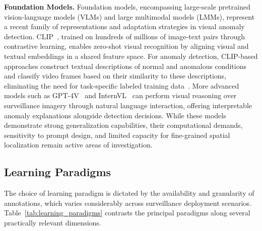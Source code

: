 \documentclass[10pt,a4paper]{article}
\begin{document}
\textbf{Foundation Models.} Foundation models, encompassing large-scale pretrained vision-language models (VLMs) and large multimodal models (LMMs), represent a recent family of representations and adaptation strategies in visual anomaly detection. CLIP~\citep{radford2021learning}, trained on hundreds of millions of image-text pairs through contrastive learning, enables zero-shot visual recognition by aligning visual and textual embeddings in a shared feature space. For anomaly detection, CLIP-based approaches construct textual descriptions of normal and anomalous conditions and classify video frames based on their similarity to these descriptions, eliminating the need for task-specific labeled training data~\citep{wu2024vadclip, zanella2024harnessing}. More advanced models such as GPT-4V~\citep{achiam2023gpt} and InternVL~\citep{chen2024internvl} can perform visual reasoning over surveillance imagery through natural language interaction, offering interpretable anomaly explanations alongside detection decisions. While these models demonstrate strong generalization capabilities, their computational demands, sensitivity to prompt design, and limited capacity for fine-grained spatial localization remain active areas of investigation.


\subsection{Learning Paradigms}
\label{subsec:learning_paradigms}

The choice of learning paradigm is dictated by the availability and granularity of annotations, which varies considerably across surveillance deployment scenarios. Table~\ref{tab:learning_paradigms} contrasts the principal paradigms along several practically relevant dimensions.
\end{document}
